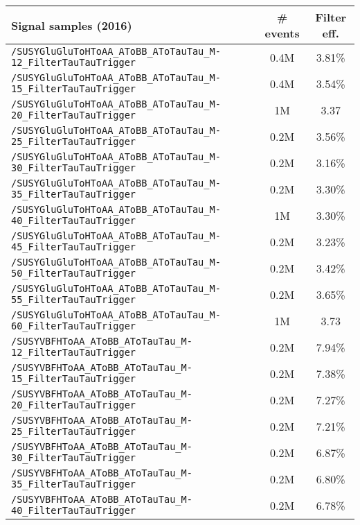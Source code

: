 \begin{table}[ht]
    \begin{center}
    {\scriptsize
    \begin{tabular}{|l|c|c|}
    \hline
    Signal samples (2016) & \# events & Filter eff.\\
    \hline
    \texttt{/SUSYGluGluToHToAA\_AToBB\_AToTauTau\_M-12\_FilterTauTauTrigger} & 0.4M & 3.81\%\\
    \texttt{/SUSYGluGluToHToAA\_AToBB\_AToTauTau\_M-15\_FilterTauTauTrigger} & 0.4M & 3.54\%\\
    \texttt{/SUSYGluGluToHToAA\_AToBB\_AToTauTau\_M-20\_FilterTauTauTrigger} & 1M & 3.37\\
    \texttt{/SUSYGluGluToHToAA\_AToBB\_AToTauTau\_M-25\_FilterTauTauTrigger} & 0.2M & 3.56\%\\
    \texttt{/SUSYGluGluToHToAA\_AToBB\_AToTauTau\_M-30\_FilterTauTauTrigger} & 0.2M & 3.16\%\\
    \texttt{/SUSYGluGluToHToAA\_AToBB\_AToTauTau\_M-35\_FilterTauTauTrigger} & 0.2M & 3.30\%\\
    \texttt{/SUSYGluGluToHToAA\_AToBB\_AToTauTau\_M-40\_FilterTauTauTrigger} & 1M & 3.30\%\\
    \texttt{/SUSYGluGluToHToAA\_AToBB\_AToTauTau\_M-45\_FilterTauTauTrigger} & 0.2M & 3.23\%\\
    \texttt{/SUSYGluGluToHToAA\_AToBB\_AToTauTau\_M-50\_FilterTauTauTrigger} & 0.2M & 3.42\%\\
    \texttt{/SUSYGluGluToHToAA\_AToBB\_AToTauTau\_M-55\_FilterTauTauTrigger} & 0.2M & 3.65\%\\
    \texttt{/SUSYGluGluToHToAA\_AToBB\_AToTauTau\_M-60\_FilterTauTauTrigger} & 1M & 3.73\\
    \hline
    \texttt{/SUSYVBFHToAA\_AToBB\_AToTauTau\_M-12\_FilterTauTauTrigger} & 0.2M & 7.94\%\\
    \texttt{/SUSYVBFHToAA\_AToBB\_AToTauTau\_M-15\_FilterTauTauTrigger} & 0.2M & 7.38\%\\
    \texttt{/SUSYVBFHToAA\_AToBB\_AToTauTau\_M-20\_FilterTauTauTrigger} & 0.2M & 7.27\%\\
    \texttt{/SUSYVBFHToAA\_AToBB\_AToTauTau\_M-25\_FilterTauTauTrigger} & 0.2M & 7.21\%\\
    \texttt{/SUSYVBFHToAA\_AToBB\_AToTauTau\_M-30\_FilterTauTauTrigger} & 0.2M & 6.87\%\\
    \texttt{/SUSYVBFHToAA\_AToBB\_AToTauTau\_M-35\_FilterTauTauTrigger} & 0.2M & 6.80\%\\
    \texttt{/SUSYVBFHToAA\_AToBB\_AToTauTau\_M-40\_FilterTauTauTrigger} & 0.2M & 6.78\%\\

\end{tabular}}
\end{center}
\end{table}

